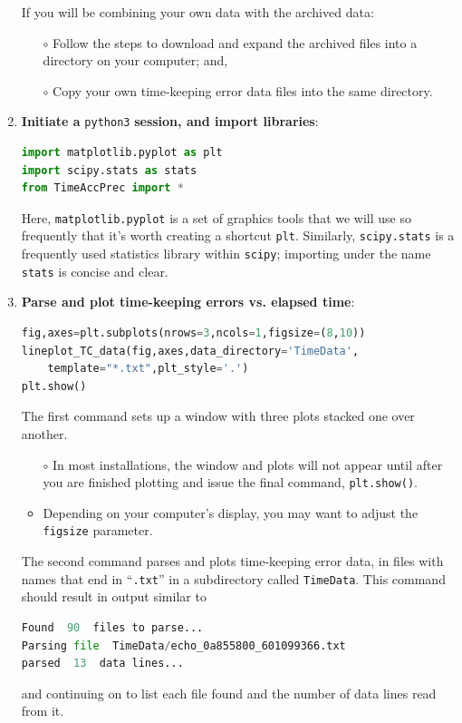 \begin{enumerate}
	\smallskip
	If you will be combining your own data with the archived data:
	\begin{itemize}
		\item[$\circ$] Follow the steps to download and expand the archived files into a directory on your computer; and,
		\item[$\circ$] Copy your own time-keeping error data files into the same directory. 
	\end{itemize}
	
	\item \textbf{Initiate a } \lstinline{python3} \textbf{session, and import libraries}:
\begin{lstlisting}[language=Python]
import matplotlib.pyplot as plt
import scipy.stats as stats
from TimeAccPrec import * 
\end{lstlisting}
	Here, \lstinline{matplotlib.pyplot} is a set of graphics tools that we will use so frequently that it's worth creating a shortcut \lstinline{plt}.
	Similarly, \lstinline{scipy.stats} is a frequently used statistics library within \lstinline{scipy}; importing under the name \lstinline{stats} is concise and clear.

	\item \textbf{Parse and plot time-keeping errors vs. elapsed time}:
\begin{lstlisting}[language=Python]
fig,axes=plt.subplots(nrows=3,ncols=1,figsize=(8,10))
lineplot_TC_data(fig,axes,data_directory='TimeData',
    template="*.txt",plt_style='.')
plt.show()
\end{lstlisting}
	The first command sets up a window with three plots stacked one over another.
	\begin{itemize}
		\item[$\circ$] In most \python installations, the window and plots will not appear until after you are finished plotting and issue the final command, \lstinline{plt.show()}.
		\item[$\circ$] Depending on your computer's display, you may want to adjust the \lstinline{figsize} parameter.
	\end{itemize}
	The second command parses and plots time-keeping error data, in files with names that end in ``\lstinline{.txt}'' in a subdirectory called \lstinline{TimeData}.
	This command should result in output similar to
\begin{lstlisting}[language=Python]
Found  90  files to parse...
Parsing file  TimeData/echo_0a855800_601099366.txt
parsed  13  data lines...
\end{lstlisting}
	and continuing on to list each file found and the number of data lines read from it.
	

\end{enumerate}
